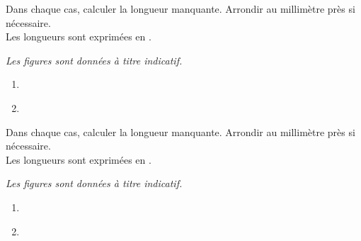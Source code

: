 \begin{exercice*}
    Dans chaque cas, calculer la longueur manquante. Arrondir au millimètre près si nécessaire.\\
    Les longueurs sont exprimées en \Lg{}.

    {\it Les figures sont données à titre indicatif.}
    \begin{multicols}{2}
        \begin{enumerate}
            \item \phantom{rrr}\\
            
            \item \phantom{rrr}\\
            
        \end{enumerate}
    \end{multicols}
\end{exercice*}
\begin{corrige}
    Dans chaque cas, calculer la longueur manquante. Arrondir au millimètre près si nécessaire.\\
    Les longueurs sont exprimées en \Lg{}.

    {\it Les figures sont données à titre indicatif.}

    \begin{enumerate}
        \item \phantom{rrr}\\
        \begin{minipage}{0.15\linewidth}
        \end{minipage}
        \begin{minipage}{0.8\linewidth}        
            {\red {}}
        \end{minipage}
        \item \phantom{rrr}\\
        \begin{minipage}{0.15\linewidth}
        \end{minipage}
        \begin{minipage}{0.8\linewidth}        
            {\red {}}
        \end{minipage}       
    \end{enumerate}
\end{corrige}